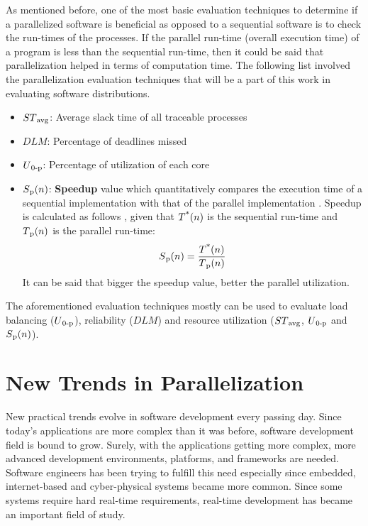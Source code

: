 As mentioned before, one of the most basic evaluation techniques to determine if a parallelized software is beneficial as opposed to a sequential software is to check the run-times of the processes. If the parallel run-time (overall execution time) of a program is less than the sequential run-time, then it could be said that parallelization helped in terms of computation time. The following list involved the parallelization evaluation techniques that will be a part of this work in evaluating software distributions.
\begin{itemize}
	\item ${ST\textsubscript{avg}}$: Average slack time of all traceable processes
	\item ${DLM}$: Percentage of deadlines missed
	\item ${U\textsubscript{0-p}}$: Percentage of utilization of each core
	\item ${S\textsubscript{p}(n)}$: \textbf{Speedup} value which quantitatively compares the execution time of a sequential implementation with that of the parallel implementation \cite{springerparallel}. Speedup is calculated as follows \cite{springerparallel}, given that ${T\textsuperscript{*}(n)}$ is the sequential run-time and ${T\textsubscript{p}(n)}$ is the parallel run-time:
	\begin{equation}\label{speedupeqn}
	S\textsubscript{p}(n)=\frac{T\textsuperscript{*}(n)}{T\textsubscript{p}(n)}
	\end{equation}
	It can be said that bigger the speedup value, better the parallel utilization.
\end{itemize}
The aforementioned evaluation techniques mostly can be used to evaluate load balancing (${U\textsubscript{0-p}}$), reliability (${DLM}$) and resource utilization (${ST\textsubscript{avg}}$, ${U\textsubscript{0-p}}$ and ${S\textsubscript{p}(n)}$). 


\section{New Trends in Parallelization} %
New practical trends evolve in software development every passing day. Since today's applications are more complex than it was before, software development field is bound to grow. Surely, with the applications getting more complex, more advanced development environments, platforms, and frameworks are needed. Software engineers has been trying to fulfill this need especially since embedded, internet-based and cyber-physical systems became more common. Since some systems require hard real-time requirements, real-time development has became an important field of study.

